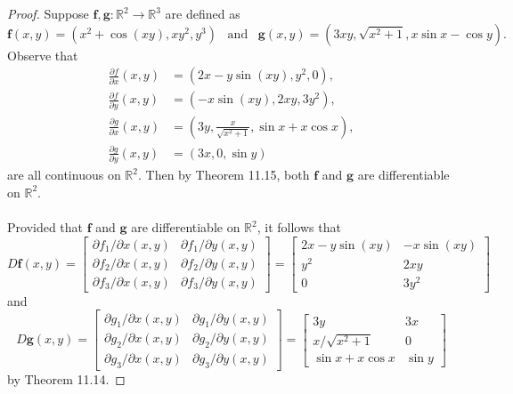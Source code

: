 \documentclass[ 12pt ]{article}
\begin{document}
\begin{enumerate}
			\begin{proof}
				Suppose $\textbf{f}, \textbf{g} : \mathbb{R}^2 \to \mathbb{R}^3$ are defined as $$\textbf{f}(x, y) = \left (x^2 + \cos(xy), xy^2, y^3 \right )\;\;\; \mathrm{and}\;\;\;
				\textbf{g}(x, y) = \left ( 3xy, \sqrt{x^2 + 1}, x \sin x - \cos y \right ).$$ Observe that
				\begin{align*}
					\frac{\partial f}{\partial x}(x, y) &= \left ( 2x - y \sin(xy), y^2, 0 \right ), \\
					\frac{\partial f}{\partial y}(x, y) &= \left ( -x \sin(xy), 2xy, 3y^2 \right ), \\
					\frac{\partial g}{\partial x}(x, y) &= \left ( 3y, \frac{x}{\sqrt{x^2 + 1}}, \sin x + x \cos x \right ), \\
					\frac{\partial g}{\partial y}(x, y) &= \left ( 3x, 0, \sin y \right )
				\end{align*}
				are all continuous on $\mathbb{R}^2$. Then by Theorem 11.15, both $\textbf{f}$ and $\textbf{g}$ are differentiable on $\mathbb{R}^2$. \\ \\
				Provided that $\textbf{f}$ and $\textbf{g}$ are differentiable on $\mathbb{R}^2$, it follows that $$D\textbf{f}(x, y) = \begin{bmatrix} \partial f_1 / \partial x(x,
				y) & \partial f_1 / \partial y(x, y) \\ \partial f_2 / \partial x (x, y) & \partial f_2 / \partial y (x, y) \\ \partial f_3 / \partial x (x, y) & \partial f_3 /
				\partial y(x, y) \end{bmatrix} = \begin{bmatrix} 2x - y \sin(xy) & -x \sin(xy) \\ y^2 & 2xy \\ 0 & 3y^2 \end{bmatrix}$$ and $$D\textbf{g}(x, y) =
				\begin{bmatrix} \partial g_1 / \partial x(x, y) & \partial g_1 / \partial y(x, y) \\ \partial g_2 / \partial x (x, y) & \partial g_2 / \partial y (x, y) \\
				\partial g_3 / \partial x (x, y) & \partial g_3 / \partial y(x, y) \end{bmatrix} = \begin{bmatrix} 3y & 3x \\ x / \sqrt{x^2 + 1} & 0 \\ \sin x + x\cos x & \sin y
				\end{bmatrix}$$ by Theorem 11.14.

\end{proof}
\end{enumerate}
\end{document}
